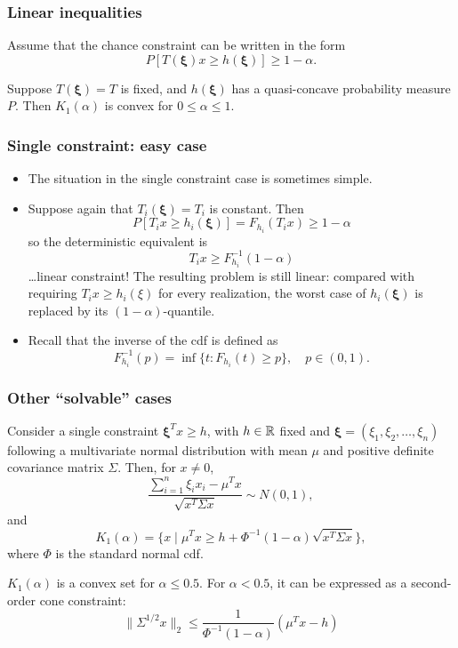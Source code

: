 \documentclass[aspectratio=169]{beamer}
\def\bxi{\boldsymbol\xi}
\begin{document}
\begin{frame}
	\frametitle{Linear inequalities}
	
Assume that the chance constraint can be written in the form
	$$
	P[T(\bxi)x \geq h(\bxi)] \geq 1-\alpha.
	$$
	
	\begin{theorem}
		Suppose $T(\bxi) = T$ is fixed, and $h(\bxi)$ has a quasi-concave
		probability measure $P$. Then $K_1(\alpha)$ is convex for $0 \leq \alpha \leq 1$.
	\end{theorem}
	
\end{frame}

\begin{frame}
\frametitle{Single constraint: easy case}

\begin{itemize}
	\item 
The situation in the single constraint case is sometimes simple.
\item 
Suppose again that $T_i (\bxi) = T_i$ is constant. Then
\[
P[T_i x \geq h_i (\bxi)] = F_{h_i}(T_i x) \geq 1-\alpha
\]
so the deterministic equivalent is
\[
T_i x \geq F_{h_i}^{-1}(1-\alpha)
\]
\ldots linear constraint! The resulting problem is still linear: compared with requiring $T_i x \geq h_i(\xi)$ for every realization, the worst case of $h_i(\bxi)$ is replaced by its $(1-\alpha)$-quantile.
\item
Recall that the inverse of the cdf is defined as
\[
F_{h_i}^{-1}(p) = \inf \lbrace t : F_{h_i} (t)  \geq p \rbrace, \quad p \in (0,1).
\]
\end{itemize}

\end{frame}

\begin{frame}
\frametitle{Other ``solvable'' cases}

Consider a single constraint $\bxi^T x \geq h$, with $h \in {\mathbb{R}}$ fixed and $\bxi = (\xi_1, \xi_2,\ldots, \xi_n)$ following a multivariate normal distribution with mean $\mu$ and positive definite covariance matrix $\Sigma$.
Then, for $x \neq 0$,
\[
\frac{\sum_{i = 1}^n \xi_i x_i - \mu^T x}{\sqrt{x^T\Sigma x}} \sim N(0,1),
\]
and
\[
K_1(\alpha) = \lbrace x \mid \mu^T x \geq h + \Phi^{-1}(1-\alpha) \sqrt{x^T\Sigma x} \rbrace,
\]
where $\Phi$ is the standard normal cdf.

\smallskip

$K_1(\alpha)$ is a convex set for $\alpha \leq 0.5$. For $\alpha < 0.5$, it can be expressed as a second-order cone constraint:
\[
\| \Sigma^{1/2} x \|_2 \leq \frac{1}{\Phi^{-1}(1-\alpha)} (\mu^T x - h)
\]

\end{frame}
\end{document}
